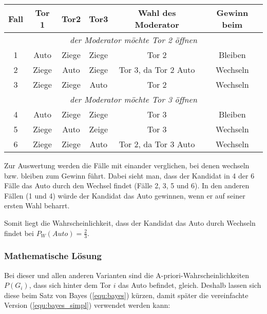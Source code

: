 \begin{tabular}[h]{|c|c|c|c|c|c|}
    \hline
    \textbf{Fall} & \textbf{Tor 1} & \textbf{Tor2} & \textbf{Tor3} & \textbf{Wahl des Moderator} & \textbf{Gewinn beim} \\
    \hline
    \multicolumn{6}{|c|}{\textit{der Moderator möchte Tor 2 öffnen} }                                                   \\
    \hline
    1             & Auto           & Ziege         & Ziege         & Tor 2                       & Bleiben              \\
    2             & Ziege          & Auto          & Ziege         & Tor 3, da Tor 2 Auto        & Wechseln             \\
    3             & Ziege          & Ziege         & Auto          & Tor 2                       & Wechseln             \\
    \hline
    \multicolumn{6}{|c|}{\textit{der Moderator möchte Tor 3 öffnen}
    }                                                                                                                   \\
    \hline
    4             & Auto           & Ziege         & Ziege         & Tor 3                       & Bleiben              \\
    5             & Ziege          & Auto          & Zeige         & Tor 3                       & Wechseln             \\
    6             & Ziege          & Ziege         & Auto          & Tor 2, da Tor 3 Auto        & Wechseln             \\
    \hline
\end{tabular}

Zur Auswertung werden die Fälle mit einander verglichen, bei denen wechseln bzw. bleiben zum Gewinn führt.
Dabei sieht man, dass der Kandidat in 4 der 6 Fälle das Auto durch den Wechsel findet (Fälle 2, 3, 5 und 6). In den anderen Fällen (1 und 4) würde der Kandidat das Auto gewinnen, wenn er auf seiner ersten Wahl beharrt.

Somit liegt die Wahrscheinlichkeit, dass der Kandidat das Auto durch Wechseln findet bei $P_W(Auto) = \frac{2}{3}$.

\subsubsection{Mathematische Lösung}

Bei dieser und allen anderen Varianten sind die A-priori-Wahrscheinlichkeiten $P(G_i)$, dass sich hinter dem Tor $i$ das Auto befindet, gleich. Deshalb lassen sich diese beim Satz von Bayes (\autoref{equ:bayes}) kürzen, damit später die vereinfachte Version (\autoref{equ:bayes_simpl}) verwendet werden kann:

